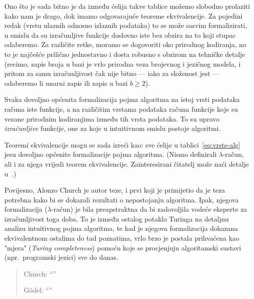 Ono što je sada bitno je da između ćelija takve tablice možemo slobodno prolaziti kako nam je drago, dok imamo odgovarajuće teoreme ekvivalencije. Za pojedini redak (vrstu ulaznih odnosno izlaznih podataka) to se može sasvim formalizirati, u smislu da su izračunljive funkcije doslovno iste bez obzira na to koji stupac odaberemo. Za različite retke, moramo se dogovoriti oko prirodnog kodiranja, no to je najčešće prilično jednostavno i dosta robusno s obzirom na tehničke detalje (recimo, zapis broja u bazi je vrlo prirodna veza brojevnog i jezičnog modela, i pritom za samu izračunljivost čak nije bitno --- iako za složenost jest --- odaberemo li unarni zapis ili zapis u bazi $b\ge2$).

\begin{ctteza}
Svaka dovoljno općenita formalizacija pojma algoritma na istoj vrsti podataka ra\-ču\-na iste funkcije, a na različitim vrstama podataka računa funkcije koje su vezane prirodnim kodiranjima između tih vrsta podataka. To su upravo \emph{izračunljive} funkcije, one za koje u intuitivnom smislu postoje algoritmi.
\end{ctteza}

Teoremi ekvivalencije mogu se sada izreći kao: sve ćelije u tablici~\eqref{eq:vrste-alg} jesu dovoljno općenite formalizacije pojma algoritma. (Nismo definirali $\lambda$-račun, ali i za njega vrijedi teorem ekvivalencije. Zainteresirani čitatelj može naći detalje u~\cite{lovnicki}.)

Povijesno, Alonzo Church je autor teze, i prvi koji je primijetio da je teza potrebna kako bi se dokazali rezultati o nepostojanju algoritma. Ipak, njegova formalizacija ($\lambda$-račun) je bila preapstraktna da bi zadovoljila vodeće eksperte za izračunljivost toga doba. To je između ostalog potaklo Turinga na detaljnu analizu intuitivnog pojma algoritma, te kad je njegova formalizacija dokazana ekvivalentnom ostalima do tad poznatima, vrlo brzo je postala prihvaćena kao "mjera" (\!\emph{Turing completeness}) pomoću koje se procjenjuju algoritamski sustavi (npr.\ programski jezici) sve do danas.

\begin{quote}
    Church: ``''
    
    G\"odel: ``''
\end{quote}

